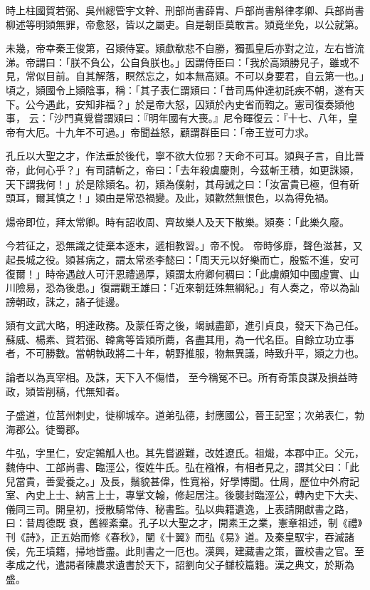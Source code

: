 \begin{pinyinscope}
 時上柱國賀若弼、吳州總管宇文幹、刑部尚書薛胄、戶部尚書斛律孝卿、兵部尚書柳述等明熲無罪，帝愈怒，皆以之屬吏。自是朝臣莫敢言。熲竟坐免，以公就第。



 未幾，帝幸秦王俊第，召熲侍宴。熲歔欷悲不自勝，獨孤皇后亦對之泣，左右皆流涕。帝謂曰：「朕不負公，公自負朕也。」因謂侍臣曰：「我於高熲勝兒子，雖或不見，常似目前。自其解落，瞑然忘之，如本無高熲。不可以身要君，自云第一也。」頃之，熲國令上熲陰事，稱：「其子表仁謂熲曰：「昔司馬仲達初託疾不朝，遂有天下。公今遇此，安知非福？」於是帝大怒，囚熲於內史省而鞫之。憲司復奏熲他事，
 云：「沙門真覺嘗謂熲曰：『明年國有大喪。』尼令暉復云：『十七、八年，皇帝有大厄。十九年不可過。」帝聞益怒，顧謂群臣曰：「帝王豈可力求。



 孔丘以大聖之才，作法垂於後代，寧不欲大位邪？天命不可耳。熲與子言，自比晉帝，此何心乎？」有司請斬之，帝曰：「去年殺虞慶則，今茲斬王積，如更誅熲，天下謂我何！」於是除熲名。初，熲為僕射，其母誡之曰：「汝富貴已極，但有斫頭耳，爾其慎之！」熲由是常恐禍變。及此，熲歡然無恨色，以為得免禍。



 煬帝即位，拜太常卿。時有詔收周、齊故樂人及天下散樂。熲奏：「此樂久廢。



 今若征之，恐無識之徒棄本逐末，遞相教習。」帝不悅。
 帝時侈靡，聲色滋甚，又起長城之役。熲甚病之，謂太常丞李懿曰：「周天元以好樂而亡，殷監不進，安可復爾！」時帝遇啟人可汗恩禮過厚，熲謂太府卿何稠曰：「此虜頗知中國虛實、山川險易，恐為後患。」復謂觀王雄曰：「近來朝廷殊無綱紀。」有人奏之，帝以為訕謗朝政，誅之，諸子徙邊。



 熲有文武大略，明達政務。及蒙任寄之後，竭誠盡節，進引貞良，發天下為己任。蘇威、楊素、賀若弼、韓禽等皆熲所薦，各盡其用，為一代名臣。自餘立功立事者，不可勝數。當朝執政將二十年，朝野推服，物無異議，時致升平，熲之力也。



 論者以為真宰相。及誅，天下入不傷惜，
 至今稱冤不已。所有奇策良謀及損益時政，熲皆削稿，代無知者。



 子盛道，位莒州刺史，徙柳城卒。道弟弘德，封應國公，晉王記室；次弟表仁，勃海郡公。徒蜀郡。



 牛弘，字里仁，安定鶉觚人也。其先嘗避難，改姓遼氏。祖熾，本郡中正。父元，魏侍中、工部尚書、臨涇公，復姓牛氏。弘在襁褓，有相者見之，謂其父曰：「此兒當貴，善愛養之。」及長，鬚貌甚偉，性寬裕，好學博聞。仕周，歷位中外府記室、內史上士、納言上士，專掌文翰，修起居注。後襲封臨涇公，轉內史下大夫、儀同三司。開皇初，授散騎常侍、秘書監。弘以典籍遺逸，上表請開獻書之路，曰：昔周德既
 衰，舊經紊棄。孔子以大聖之才，開素王之業，憲章祖述，制《禮》刊《詩》，正五始而修《春秋》，闡《十翼》而弘《易》道。及秦皇馭宇，吞滅諸侯，先王墳籍，掃地皆盡。此則書之一厄也。漢興，建藏書之策，置校書之官。至孝成之代，遣謁者陳農求遺書於天下，詔劉向父子讎校篇籍。漢之典文，於斯為盛。




\end{pinyinscope}
